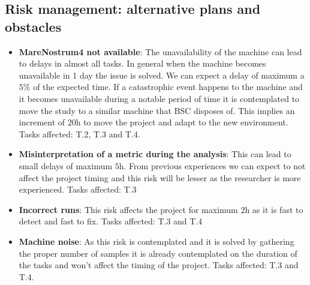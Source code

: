 \subsection{Risk management: alternative plans and obstacles}

\begin{itemize}
  \item \textbf{MareNostrum4 not available}: The unavailability of the machine can lead to delays in almost all tasks. In general when the machine becomes unavailable in 1 day the issue is solved. We can expect a delay of maximum a $5\%$ of the expected time. If a catastrophic event happens to the machine and it becomes unavailable during a notable period of time it is contemplated to move the study to a similar machine that BSC disposes of. This implies an increment of $\si{20\hour}$ to move the project and adapt to the new environment. Tasks affected: T.2, T.3 and T.4.

  \item \textbf{Misinterpretation of a metric during the analysis}: This can lead to small delays of maximum $\si{5\hour}$. From previous experiences we can expect to not affect the project timing and this risk will be lesser as the researcher is more experienced. Tasks affected: T.3

  \item \textbf{Incorrect runs}: This risk affects the project for maximum $\si{2\hour}$ as it is fast to detect and fast to fix. Tasks affected: T.3 and T.4

  \item \textbf{Machine noise}: As this risk is contemplated and it is solved by gathering the proper number of samples it is already contemplated on the duration of the tasks and won't affect the timing of the project. Tasks affected: T.3 and T.4. 
\end{itemize}
